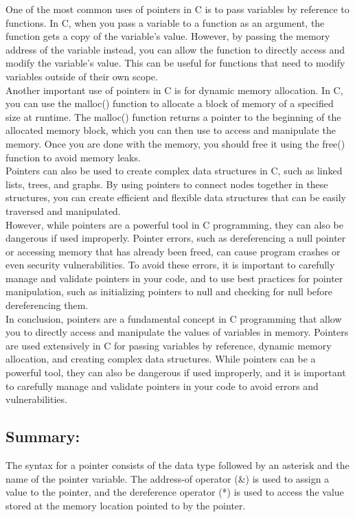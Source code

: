 \documentclass[12pt, letterpaper]{report}
\begin{document}
One of the most common uses of pointers in C is to pass variables by 
reference to functions. In C, when you pass a variable to a function as an 
argument, the function gets a copy of the variable's value. However, by 
passing the memory address of the variable instead, you can allow the function 
to directly access and modify the variable's value. This can be useful for 
functions that need to modify variables outside of their own scope.\\

Another important use of pointers in C is for dynamic memory allocation. In C,
you can use the malloc() function to allocate a block of memory of a specified 
size at runtime. The malloc() function returns a pointer to the beginning of 
the allocated memory block, which you can then use to access and manipulate 
the memory. Once you are done with the memory, you should free it using the 
free() function to avoid memory leaks.\\

Pointers can also be used to create complex data structures in C, such as 
linked lists, trees, and graphs. By using pointers to connect nodes together 
in these structures, you can create efficient and flexible data structures 
that can be easily traversed and manipulated.\\

However, while pointers are a powerful tool in C programming, they can also be
dangerous if used improperly. Pointer errors, such as dereferencing a null 
pointer or accessing memory that has already been freed, can cause program 
crashes or even security vulnerabilities. To avoid these errors, it is 
important to carefully manage and validate pointers in your code, and to use 
best practices for pointer manipulation, such as initializing pointers to null
and checking for null before dereferencing them.\\

In conclusion, pointers are a fundamental concept in C programming that allow 
you to directly access and manipulate the values of variables in memory. 
Pointers are used extensively in C for passing variables by reference, 
dynamic memory allocation, and creating complex data structures. While 
pointers can be a powerful tool, they can also be dangerous if used improperly,
and it is important to carefully manage and validate pointers in your code to 
avoid errors and vulnerabilities.\\


\subsection*{Summary:}
The syntax for a pointer consists of the data type followed by an asterisk
and the name of the pointer variable. The address-of operator (\&) is used 
to assign a value to the pointer, and the dereference operator (*) is 
used to access the value stored at the memory location pointed to by the 
pointer.
\end{document}

